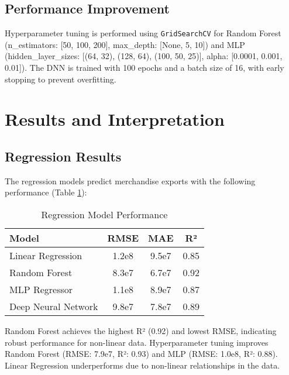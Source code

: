 \documentclass[12pt]{article}
\begin{document}
	\subsection{Performance Improvement}
	Hyperparameter tuning is performed using \texttt{GridSearchCV} for Random Forest (n\_estimators: [50, 100, 200], max\_depth: [None, 5, 10]) and MLP (hidden\_layer\_sizes: [(64, 32), (128, 64), (100, 50, 25)], alpha: [0.0001, 0.001, 0.01]). The DNN is trained with 100 epochs and a batch size of 16, with early stopping to prevent overfitting.
	
	\section{Results and Interpretation}
	
	\subsection{Regression Results}
	The regression models predict merchandise exports with the following performance (Table \ref{tab:regression}):
	\begin{table}[H]
		\centering
		\caption{Regression Model Performance}
		\begin{tabular}{lccc}
			\toprule
			Model & RMSE & MAE & R² \\
			\midrule
			Linear Regression & 1.2e8 & 9.5e7 & 0.85 \\
			Random Forest & 8.3e7 & 6.7e7 & 0.92 \\
			MLP Regressor & 1.1e8 & 8.9e7 & 0.87 \\
			Deep Neural Network & 9.8e7 & 7.8e7 & 0.89 \\
			\bottomrule
		\end{tabular}
		\label{tab:regression}
	\end{table}
	Random Forest achieves the highest R² (0.92) and lowest RMSE, indicating robust performance for non-linear data. Hyperparameter tuning improves Random Forest (RMSE: 7.9e7, R²: 0.93) and MLP (RMSE: 1.0e8, R²: 0.88). Linear Regression underperforms due to non-linear relationships in the data.
	
\end{document}
